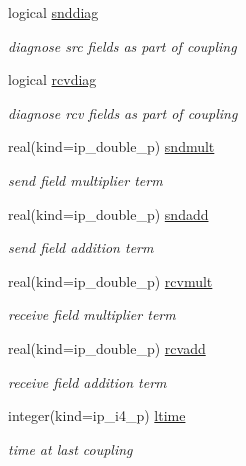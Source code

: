 \begin{DoxyCompactItemize}
logical \hyperlink{structmod__oasis__coupler_1_1prism__coupler__type_ae0ad5bd2dfbc17cbdceeda23c92dbebe}{snddiag}
\begin{DoxyCompactList}\small\item\em diagnose src fields as part of coupling \end{DoxyCompactList}\item 
logical \hyperlink{structmod__oasis__coupler_1_1prism__coupler__type_a05d7a7317dd4b063ced94cebd4dfedc7}{rcvdiag}
\begin{DoxyCompactList}\small\item\em diagnose rcv fields as part of coupling \end{DoxyCompactList}\item 
real(kind=ip\+\_\+double\+\_\+p) \hyperlink{structmod__oasis__coupler_1_1prism__coupler__type_ad17bb1c791d2ef48cf7b4abf955bf43b}{sndmult}
\begin{DoxyCompactList}\small\item\em send field multiplier term \end{DoxyCompactList}\item 
real(kind=ip\+\_\+double\+\_\+p) \hyperlink{structmod__oasis__coupler_1_1prism__coupler__type_ad0176e1d6bdcb0f50fc5889921aec8dc}{sndadd}
\begin{DoxyCompactList}\small\item\em send field addition term \end{DoxyCompactList}\item 
real(kind=ip\+\_\+double\+\_\+p) \hyperlink{structmod__oasis__coupler_1_1prism__coupler__type_a9733b71cc0ade029f7f19be6ad114596}{rcvmult}
\begin{DoxyCompactList}\small\item\em receive field multiplier term \end{DoxyCompactList}\item 
real(kind=ip\+\_\+double\+\_\+p) \hyperlink{structmod__oasis__coupler_1_1prism__coupler__type_adee95ace457db5ccaacc0195f3327277}{rcvadd}
\begin{DoxyCompactList}\small\item\em receive field addition term \end{DoxyCompactList}\item 
integer(kind=ip\+\_\+i4\+\_\+p) \hyperlink{structmod__oasis__coupler_1_1prism__coupler__type_a5d93a8e5b39d3b713e8f1bf4760b10f9}{ltime}
\begin{DoxyCompactList}\small\item\em time at last coupling \end{DoxyCompactList}\item 

\end{DoxyCompactItemize}
